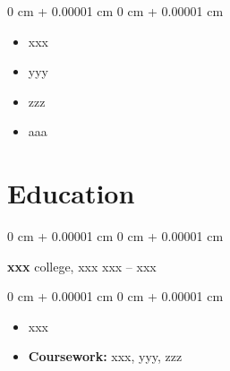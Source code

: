 \documentclass[10pt, letterpaper]{article}
\newenvironment{highlights}{
    \begin{itemize}[
        topsep=0.10 cm,
        parsep=0.10 cm,
        partopsep=0pt,
        itemsep=0pt,
        leftmargin=0 cm + 10pt
    ]
}{
    \end{itemize}
} %
\newenvironment{onecolentry}{
    \begin{adjustwidth}{
        0 cm + 0.00001 cm
    }{
        0 cm + 0.00001 cm
    }
}{
    \end{adjustwidth}
} %
\newenvironment{twocolentry}[2][]{
    \onecolentry
    \def\secondColumn{#2}
    \setcolumnwidth{\fill, 4.5 cm}
    \begin{paracol}{2}
}{
    \switchcolumn \raggedleft \secondColumn
    \end{paracol}
    \endonecolentry
} %
\begin{document}
        \vspace{0.10 cm}
        \begin{onecolentry}
            \begin{highlights}
                \item xxx
                \item yyy
                \item zzz
                \item aaa
            \end{highlights}
        \end{onecolentry}

    \section{Education}

        \begin{twocolentry}{
            xxx – xxx
        }
            \textbf{xxx} college, xxx\end{twocolentry}

        \vspace{0.10 cm}
        \begin{onecolentry}
            \begin{highlights}
                \item xxx 
                \item \textbf{Coursework:} xxx, yyy, zzz
            \end{highlights}
        \end{onecolentry}
\end{document}
